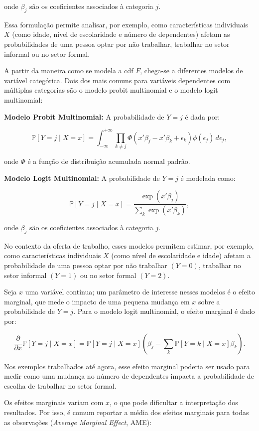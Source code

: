 \documentclass[12pt, a4paper, openany]{book}
\numberwithin{equation}{chapter}
\numberwithin{table}{chapter}
\numberwithin{figure}{chapter}
\theoremstyle{break}
\begin{document}
onde \( \beta_j \) são os coeficientes associados à categoria \( j \).

Essa formulação permite analisar, por exemplo, como características individuais \( X \) (como idade, nível de escolaridade e número de dependentes) afetam as probabilidades de uma pessoa optar por não trabalhar, trabalhar no setor informal ou no setor formal.

A partir da maneira como se modela a cdf \( F \), chega-se a diferentes modelos de variável categórica. Dois dos mais comuns para variáveis dependentes com múltiplas categorias são o modelo probit multinomial e o modelo logit multinomial:

\textbf{Modelo Probit Multinomial:} A probabilidade de \( Y = j \) é dada por:

\[
\mathbb{P}[Y = j \mid X = x] = \int_{-\infty}^{+\infty} \prod_{k \neq j} \Phi(x'\beta_j - x'\beta_k + \epsilon_k) \phi(\epsilon_j) \, d\epsilon_j,
\]

onde \( \Phi \) é a função de distribuição acumulada normal padrão.

\textbf{Modelo Logit Multinomial:} A probabilidade de \( Y = j \) é modelada como:

\[
\mathbb{P}[Y = j \mid X = x] = \frac{\exp(x'\beta_j)}{\sum_{k} \exp(x'\beta_k)},
\]

onde \( \beta_j \) são os coeficientes associados à categoria \( j \).

No contexto da oferta de trabalho, esses modelos permitem estimar, por exemplo, como características individuais \( X \) (como nível de escolaridade e idade) afetam a probabilidade de uma pessoa optar por não trabalhar \( (Y = 0) \), trabalhar no setor informal \( (Y = 1) \) ou no setor formal \( (Y = 2) \).

Seja \( x \) uma variável contínua; um parâmetro de interesse nesses modelos é o efeito marginal, que mede o impacto de uma pequena mudança em \( x \) sobre a probabilidade de \( Y = j \). Para o modelo logit multinomial, o efeito marginal é dado por:

\[
\frac{\partial}{\partial x} \mathbb{P}[Y = j \mid X = x] = \mathbb{P}[Y = j \mid X = x] \left( \beta_j - \sum_{k} \mathbb{P}[Y = k \mid X = x] \beta_k \right).
\]

Nos exemplos trabalhados até agora, esse efeito marginal poderia ser usado para medir como uma mudança no número de dependentes impacta a probabilidade de escolha de trabalhar no setor formal.

Os efeitos marginais variam com \( x \), o que pode dificultar a interpretação dos resultados. Por isso, é comum reportar a média dos efeitos marginais para todas as observações (\textit{Average Marginal Effect}, AME):
\end{document}
